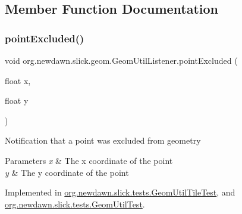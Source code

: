 \subsection{Member Function Documentation}
\mbox{\label{interfaceorg_1_1newdawn_1_1slick_1_1geom_1_1_geom_util_listener_ab800520173f64c032206777411644b4c}} 
\subsubsection{\texorpdfstring{point\+Excluded()}{pointExcluded()}}
{\footnotesize\ttfamily void org.\+newdawn.\+slick.\+geom.\+Geom\+Util\+Listener.\+point\+Excluded (\begin{DoxyParamCaption}\item[{float}]{x,  }\item[{float}]{y }\end{DoxyParamCaption})}

Notification that a point was excluded from geometry


\begin{DoxyParams}{Parameters}
{\em x} & The x coordinate of the point \\
\hline
{\em y} & The y coordinate of the point \\
\hline
\end{DoxyParams}


Implemented in \mbox{\hyperlink{classorg_1_1newdawn_1_1slick_1_1tests_1_1_geom_util_tile_test_a64220cb1bcc1b44dccb00d04fbf77b26}{org.\+newdawn.\+slick.\+tests.\+Geom\+Util\+Tile\+Test}}, and \mbox{\hyperlink{classorg_1_1newdawn_1_1slick_1_1tests_1_1_geom_util_test_a3099e54a12dd0e144f0c4dee9edef987}{org.\+newdawn.\+slick.\+tests.\+Geom\+Util\+Test}}.

\mbox{\label{interfaceorg_1_1newdawn_1_1slick_1_1geom_1_1_geom_util_listener_aac2e6eb21b135b8af600cbd2fa0b1402}} 
